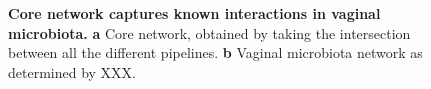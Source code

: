   \begin{figure}[h]
    \begin{center}
      \caption{\textbf{Core network captures known interactions in vaginal microbiota.} \textbf{a} Core network, obtained by taking the intersection between all the different pipelines. \textbf{b} Vaginal microbiota network as determined by XXX.}
      \label{fig:network_comparison}
    \end{center}
  \end{figure}
